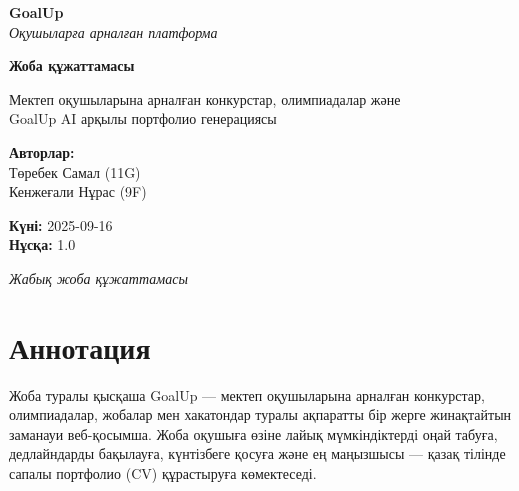 \documentclass[12pt,a4paper]{article}
\begin{document}
\begin{titlepage}
    \centering
    
    \vspace*{1cm}
    \begin{tcolorbox}[colback=goalupyellow, colframe=goalupblack, boxrule=3pt, arc=10pt, width=8cm]
        \centering
        \Huge\textbf{\textcolor{goalupblack}{GoalUp}}\\
        \Large\textit{Оқушыларға арналған платформа}
    \end{tcolorbox}
    
    \vspace{2cm}
    
    {\Huge\bfseries\textcolor{goaluppurple}{Жоба құжаттамасы}}
    
    \vspace{1cm}
    
    {\Large\textcolor{goalupgray}{Мектеп оқушыларына арналған конкурстар, олимпиадалар және\\
    GoalUp AI арқылы портфолио генерациясы}}
    
    \vspace{2cm}
    
    \begin{tcolorbox}[colback=white, colframe=goaluppurple, boxrule=2pt, arc=5pt]
        \centering
        \textbf{Авторлар:}\\
        Төребек Самал (11G)\\
        Кенжеғали Нұрас (9F)
        
        \vspace{0.5cm}
        
        \textbf{Күні:} 2025-09-16\\
        \textbf{Нұсқа:} 1.0
    \end{tcolorbox}
    
    \vfill
    
    \textcolor{goalupgray}{\textit{Жабық жоба құжаттамасы}}
    
\end{titlepage}

\tableofcontents
\newpage

\section{Аннотация}

\begin{infobox}{Жоба туралы қысқаша}
GoalUp — мектеп оқушыларына арналған конкурстар, олимпиадалар, жобалар мен хакатондар туралы ақпаратты бір жерге жинақтайтын заманауи веб-қосымша. Жоба оқушыға өзіне лайық мүмкіндіктерді оңай табуға, дедлайндарды бақылауға, күнтізбеге қосуға және ең маңызшысы — қазақ тілінде сапалы портфолио (CV) құрастыруға көмектеседі.
\end{infobox}
\end{document}
